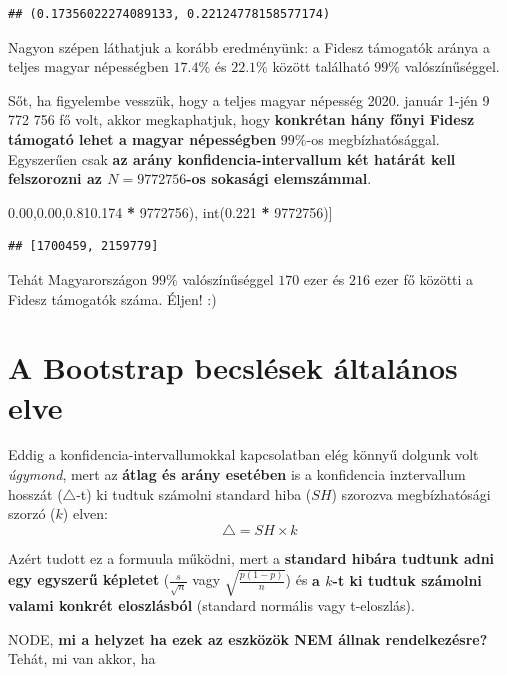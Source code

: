 \documentclass[
]{book}
\newenvironment{Shaded}{\begin{snugshade}}{\end{snugshade}}
\newcommand{\BuiltInTok}[1]{#1}
\newcommand{\DecValTok}[1]{\textcolor[rgb]{0.00,0.00,0.81}{#1}}
\newcommand{\FloatTok}[1]{\textcolor[rgb]{0.00,0.00,0.81}{#1}}
\newcommand{\NormalTok}[1]{#1}
\newcommand{\OperatorTok}[1]{\textcolor[rgb]{0.81,0.36,0.00}{\textbf{#1}}}
\begin{document}
\begin{verbatim}
## (0.17356022274089133, 0.22124778158577174)
\end{verbatim}

Nagyon szépen láthatjuk a korább eredményünk: a Fidesz támogatók aránya a teljes magyar népességben \(17.4\%\) és \(22.1\%\) között található \(99\%\) valószínűséggel.

Sőt, ha figyelembe vesszük, hogy a teljes magyar népesség 2020. január 1-jén 9 772 756 fő volt, akkor megkaphatjuk, hogy \textbf{konkrétan hány főnyi Fidesz támogató lehet a magyar népességben} \(99\%\)-os megbízhatósággal. Egyszerűen csak \textbf{az arány konfidencia-intervallum két határát kell felszorozni az \(N=9772756\)-os sokasági elemszámmal}.

\begin{Shaded}
\begin{Highlighting}[]
\NormalTok{[}\BuiltInTok{int}\NormalTok{(}\FloatTok{0.174} \OperatorTok{*} \DecValTok{9772756}\NormalTok{), }\BuiltInTok{int}\NormalTok{(}\FloatTok{0.221} \OperatorTok{*} \DecValTok{9772756}\NormalTok{)]}
\end{Highlighting}
\end{Shaded}

\begin{verbatim}
## [1700459, 2159779]
\end{verbatim}

Tehát Magyarországon \(99\%\) valószínűséggel \(170\) ezer és \(216\) ezer fő közötti a Fidesz támogatók száma. Éljen! :)

\section{A Bootstrap becslések általános elve}\label{a-bootstrap-becsluxe9sek-uxe1ltaluxe1nos-elve}

Eddig a konfidencia-intervallumokkal kapcsolatban elég könnyű dolgunk volt \emph{úgymond}, mert az \textbf{átlag és arány esetében} is a konfidencia inztervallum hosszát (\(\triangle\)-t) ki tudtuk számolni standard hiba (\(SH\)) szorozva megbízhatósági szorzó (\(k\)) elven: \[\triangle=SH \times k\]

Azért tudott ez a formuula működni, mert a \textbf{standard hibára tudtunk adni egy egyszerű képletet} (\(\frac{s}{\sqrt{n}}\) vagy \(\sqrt{\frac{p(1-p)}{n}}\)) és \textbf{a \(k\)-t ki tudtuk számolni valami konkrét eloszlásból} (standard normális vagy t-eloszlás).

NODE, \textbf{mi a helyzet ha ezek az eszközök NEM állnak rendelkezésre?} Tehát, mi van akkor, ha
\end{document}
